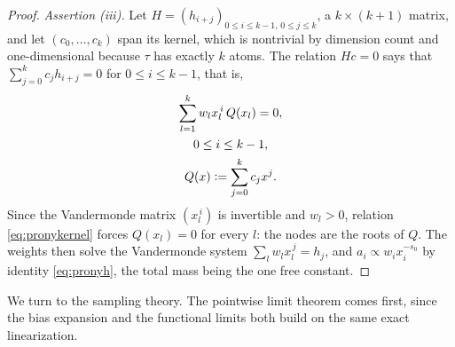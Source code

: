 \documentclass[sn-mathphys-num]{sn-jnl}
\theoremstyle{thmstyleone}%
\theoremstyle{thmstyletwo}%
\theoremstyle{thmstylethree}%
\theoremstyle{thmstyleone}%
\providecommand{\eqdef}{\mathrel{\vcentcolon=}}
\begin{document}
\begin{appendices}
\begin{proof}
			\emph{Assertion (iii).} Let $H=(h_{i+j})_{0\le i\le k-1,\,
				0\le j\le k}$, a $k\times(k+1)$ matrix, and let
			$(c_0,\dots,c_k)$ span its kernel, which is nontrivial by
			dimension count and one-dimensional because $\tau$ has exactly
			$k$ atoms. The relation $Hc=0$ says that
			$\sum_{j=0}^kc_jh_{i+j}=0$ for $0\le i\le k-1$, that is,
			\begin{equation}\label{eq:pronykernel}
				\begin{gathered}
					\sum_{l=1}^{k}w_lx_l^{\,i}\,Q(x_l)=0,\\
					0\le i\le k-1,\\
					Q(x)\eqdef\sum_{j=0}^kc_jx^{j} .
				\end{gathered}
			\end{equation}
			Since the Vandermonde matrix $(x_l^{\,i})$ is invertible and
			$w_l>0$, relation \eqref{eq:pronykernel} forces
			$Q(x_l)=0$ for every $l$: the nodes are the roots of $Q$. The
			weights then solve the Vandermonde system
			$\sum_lw_lx_l^{\,j}=h_j$, and $a_i\propto w_ix_i^{-s_0}$ by
			identity \eqref{eq:pronyh}, the total mass being the one free constant.
		\end{proof}
		
		We turn to the sampling theory. The pointwise limit theorem comes
		first, since the bias expansion and the functional limits both
		build on the same exact linearization.
		
		\thmclt*
		

\end{appendices}
\end{document}
